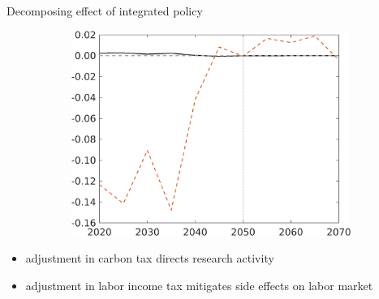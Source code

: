 \documentclass[11pt,aspectratio=169]{beamer}
\begin{document}
\begin{frame}{Decomposing effect of integrated policy }
\begin{figure}
\begin{subfigure}{0.45\textwidth}
			\includegraphics[width=1\textwidth]{../codding_model/own_basedOnFried/optimalPol_010922_revision/figures/all_13Sept22/NewCalib_polTaulFixedTaufJointPer_Hagg_Sun2_emnet1_spillover0_knspil3_xgr0_nsk0_sep0_extern0_PV1_etaa0.79_lgd0.png}
		\end{subfigure}
	\end{figure}
	\vspace{3mm}
	\begin{block}{}
		\begin{itemize}
			\item adjustment in carbon tax directs research activity 
			\item adjustment in labor income tax mitigates side effects on labor market
		\end{itemize}
	\end{block}	
\end{frame}


\hypertarget{conc}{}
\end{document}

